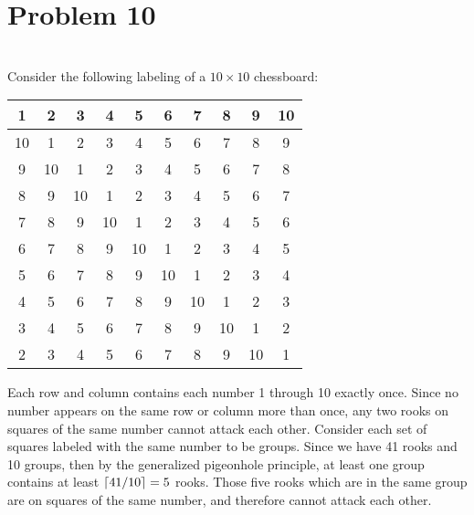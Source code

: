 \documentclass[12pt]{article}
\DeclarePairedDelimiter{\ceil}{\lceil}{\rceil}
\begin{document}
\newpage
\section*{Problem 10}
\\

Consider the following labeling of a $10\times10$ chessboard:
\begin{center}
    \begin{tabular}{|c|c|c|c|c|c|c|c|c|c|}
        \hline
        1 & 2 & 3 & 4 & 5 & 6 & 7 & 8 & 9 & 10 \\
        \hline
        10 & 1 & 2 & 3 & 4 & 5 & 6 & 7 & 8 & 9 \\
        \hline
        9 & 10 & 1 & 2 & 3 & 4 & 5 & 6 & 7 & 8 \\
        \hline
        8 & 9 & 10 & 1 & 2 & 3 & 4 & 5 & 6 & 7 \\
        \hline
        7 & 8 & 9 & 10 & 1 & 2 & 3 & 4 & 5 & 6 \\
        \hline
        6 & 7 & 8 & 9 & 10 & 1 & 2 & 3 & 4 & 5 \\
        \hline
        5 & 6 & 7 & 8 & 9 & 10 & 1 & 2 & 3 & 4 \\
        \hline
        4 & 5 & 6 & 7 & 8 & 9 & 10 & 1 & 2 & 3 \\
        \hline
        3 & 4 & 5 & 6 & 7 & 8 & 9 & 10 & 1 & 2 \\
        \hline
        2 & 3 & 4 & 5 & 6 & 7 & 8 & 9 & 10 & 1 \\
        \hline
    \end{tabular}
\end{center}

Each row and column contains each number 1 through 10 exactly once. Since no number appears on the same row or column more than once, any two rooks on squares of the same number cannot attack each other. Consider each set of squares labeled with the same number to be groups. Since we have 41 rooks and 10 groups, then by the generalized pigeonhole principle, at least one group contains at least $\ceil{41/10} = 5$ rooks. Those five rooks which are in the same group are on squares of the same number, and therefore cannot attack each other.
\end{document}
